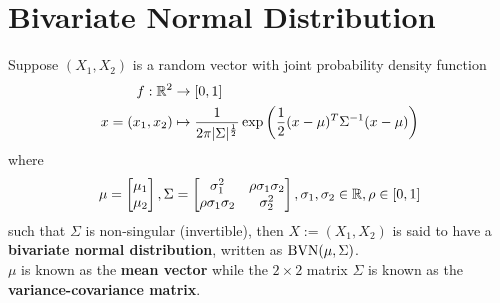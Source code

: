 \documentclass[11pt,fleqn]{book} %
\begin{document}

\section{Bivariate Normal Distribution}

\begin{definition}
Suppose \((X_1, X_2)\) is a random vector with joint probability density function
\[
\begin{aligned}
f: \mathbb{R}^2 &\rightarrow [0, 1] \\
x = (x_1, x_2) &\mapsto \frac{1}{2\pi |\Sigma|^{\frac12}}\exp\left(\frac12(x - \mu)^T \Sigma^{-1}(x - \mu)\right)
\end{aligned}
\]
where
\[
\mu = \begin{bmatrix} 
\mu_1 \\ 
\mu_2 
\end{bmatrix},
\Sigma = \begin{bmatrix} 
\sigma_1^2 & \rho\sigma_1\sigma_2 \\
\rho\sigma_1\sigma_2 & \sigma_2^2
\end{bmatrix}, \sigma_1, \sigma_2 \in \mathbb{R}, \rho \in [0, 1]
\]
such that \(\Sigma\) is non-singular (invertible), then \(X := (X_1, X_2)\) is said to have a \textbf{bivariate normal distribution}, written as \(\operatorname{BVN}(\mu, \Sigma)\). \\
\indent \(\mu\) is known as the \textbf{mean vector} while the \(2 \times 2\) matrix \(\Sigma\) is known as the \textbf{variance-covariance matrix}.
\end{definition}
\end{document}
